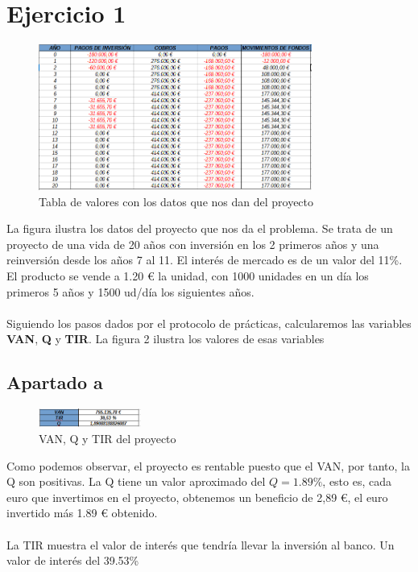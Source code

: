 \documentclass[11pt,letterpaper,onecolumn]{article}
\begin{document}
\section{Ejercicio 1}%
\label{sec:Ejercicio 1}
\begin{figure}[h]
	\centering
	\caption{Tabla de valores con los datos que nos dan del proyecto}	
	\includegraphics[width=0.8\textwidth]{imagen/ej1_1.PNG}
\end{figure}
La figura ilustra los datos del proyecto que nos da el problema. Se trata de un proyecto de una vida de 20 años con inversión en los 2 primeros años y una reinversión desde los años 7 al 11. El interés de mercado es de un valor del 11\%. El producto se vende a 1.20 € la unidad, con 1000 unidades en un día los primeros 5 años y 1500 ud/día los siguientes años. \\ 
\\
Siguiendo los pasos dados por el protocolo de prácticas, calcularemos las variables \textbf{VAN}, \textbf{Q} y \textbf{TIR}. La figura 2 ilustra los valores de esas variables
\newpage
\hspace{5cm}
\subsection{Apartado a}
\begin{figure}[H]
	\centering
	\includegraphics[width=0.3\textwidth]{imagen/ej1_van.PNG}
	\caption{VAN, Q y TIR del proyecto}
	\label{fig:}
\end{figure}
Como podemos observar, el proyecto es rentable puesto que el VAN, por tanto, la Q son positivas. La Q tiene un valor aproximado del $Q=1.89 \%$, esto es, cada euro que invertimos en el proyecto, obtenemos un beneficio de 2,89 €, el euro invertido más 1.89 € obtenido. \\
\\
La TIR muestra el valor de interés que tendría llevar la inversión al banco. Un valor de interés del 39.53\%
\end{document}
